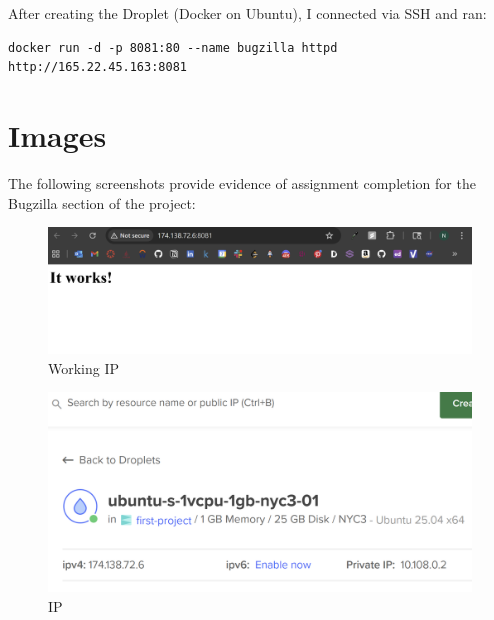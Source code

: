 After creating the Droplet (Docker on Ubuntu), I connected via SSH and ran:
\begin{verbatim}
docker run -d -p 8081:80 --name bugzilla httpd
http://165.22.45.163:8081
\end{verbatim}

\section{Images}
The following screenshots provide evidence of assignment completion for the Bugzilla section of the project:


\begin{figure}[ht]
    \centering
    \includegraphics[width=0.6\linewidth]{Book_SSW590_1/eps/Screenshots/Overleaf_1.png}
    \caption{Working IP}
    \label{fig: Working IP}
\end{figure}


\begin{figure}[ht]
    \centering
    \includegraphics[width=0.6\linewidth]{Book_SSW590_1/eps/Screenshots/Overleaf_2.png}
    \caption{IP}
    \label{IP}
\end{figure}
